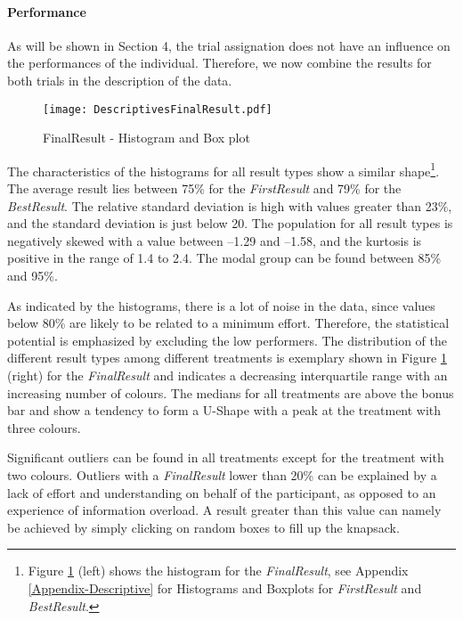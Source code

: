 \paragraph{Performance}
\label{ch:Evaluation:sec:DescriptiveStatistics:subsec:Performance}
As will be shown in Section 4, the trial assignation does not have an influence on the performances of the individual. Therefore, we now combine the results for both trials in the description of the data.
\begin{figure}[htbp] %
\begin{center}
  \caption{FinalResult - Histogram and Box plot}
    \label{DistributionFinalResult} 
  \texttt{[image: DescriptivesFinalResult.pdf]}
\end{center}
\end{figure}
The characteristics of the histograms for all result types show a similar shape\footnote{Figure \ref{DistributionFinalResult} (left) shows the histogram for the \textit{FinalResult}, see Appendix \ref{Appendix-Descriptive} for Histograms and Boxplots for \textit{FirstResult} and \textit{BestResult}.}. The average result lies between 75\% for the \textit{FirstResult} and 79\% for the \textit{BestResult}. The relative standard deviation is high with values greater than 23\%, and the standard deviation is just below 20. 
The population for all result types is negatively skewed with a value between --1.29 and --1.58, and the kurtosis is positive in the range of 1.4 to 2.4. The modal group can be found between 85\% and 95\%.

As indicated by the histograms, there is a lot of noise in the data, since values below 80\% are likely to be related to a minimum effort. Therefore, the statistical potential is emphasized by excluding the low performers.
The distribution of the different result types among different treatments is exemplary shown in Figure \ref{DistributionFinalResult} (right) for the \textit{FinalResult} and indicates a decreasing interquartile range with an increasing number of colours. The medians for all treatments are above the bonus bar and show a tendency to form a U-Shape with a peak at the treatment with three colours.

Significant outliers can be found in all treatments except for the treatment with two colours. Outliers with a \textit{FinalResult} lower than 20\% can be explained by a lack of effort and understanding on behalf of the participant, as opposed to an experience of information overload. A result greater than this value can namely be achieved by simply clicking on random boxes to fill up the knapsack.

